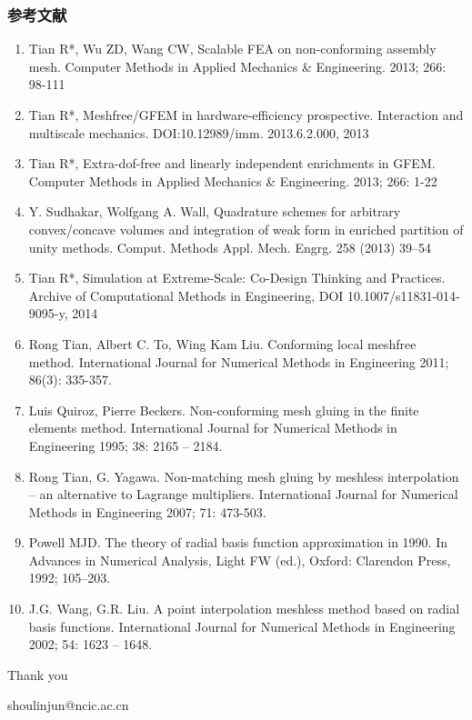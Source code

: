 \documentclass[mathserif]{beamer}
\begin{document}
\begin{CJK}{UTF8}{gkai}
\begin{frame}
	\frametitle{参考文献}
	\begin{enumerate}
		\tiny
		\item Tian R*, Wu ZD, Wang CW, Scalable FEA on non-conforming assembly mesh. Computer Methods in Applied Mechanics \& Engineering. 2013; 266: 98-111
		\item Tian R*, Meshfree/GFEM in hardware-efficiency prospective. Interaction and multiscale mechanics. DOI:10.12989/imm. 2013.6.2.000, 2013 
		\item Tian R*, Extra-dof-free and linearly independent enrichments in GFEM. Computer Methods in Applied Mechanics \& Engineering. 2013; 266: 1-22
		\item Y. Sudhakar, Wolfgang A. Wall, Quadrature schemes for arbitrary convex/concave volumes and integration of weak form in enriched partition of unity methods. Comput. Methods Appl. Mech. Engrg. 258 (2013) 39–54
		\item Tian R*, Simulation at Extreme-Scale: Co-Design Thinking and Practices. Archive of Computational Methods in Engineering, DOI 10.1007/s11831-014-9095-y, 2014
		\item Rong Tian, Albert C. To, Wing Kam Liu. Conforming local meshfree method. International Journal for Numerical Methods in Engineering 2011; 86(3): 335-357.
		\item Luis Quiroz, Pierre Beckers. Non-conforming mesh gluing in the finite elements method. International Journal for Numerical Methods in Engineering 1995; 38: 2165 – 2184.
		\item Rong Tian, G. Yagawa. Non-matching mesh gluing by meshless interpolation – an alternative to Lagrange multipliers. International Journal for Numerical Methods in Engineering 2007; 71: 473-503.
		\item Powell MJD. The theory of radial basis function approximation in 1990. In Advances in Numerical Analysis, Light FW (ed.), Oxford: Clarendon Press, 1992; 105–203.
		\item J.G. Wang, G.R. Liu. A point interpolation meshless method based on radial basis functions. International Journal for Numerical Methods in Engineering 2002; 54: 1623 – 1648.
		
	\end{enumerate}
\end{frame}

\begin{frame}	
	\begin{block}
		\Huge{\centerline{Thank you}}
		\centerline{shoulinjun@ncic.ac.cn}
	\end{block}
\end{frame}
		
\end{CJK}
\end{document}
